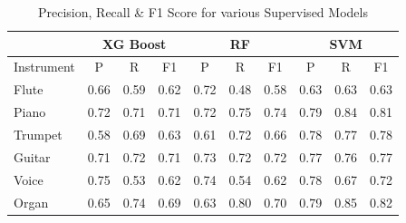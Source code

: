 \documentclass{article}
\begin{document}
\begin{itemize}
\begin{center}
\begin{table}[h!]
			
			\begin{tabular}{@{}l|lll|lll|lll@{}}
				\toprule
				& \multicolumn{3}{c}{\textbf{XG Boost}}                                  & \multicolumn{3}{c}{\textbf{RF}}                                        & \multicolumn{3}{c}{\textbf{SVM}}                                       \\ \midrule
				Instrument & \multicolumn{1}{c}{P} & \multicolumn{1}{c}{R} & \multicolumn{1}{c}{F1} & \multicolumn{1}{c}{P} & \multicolumn{1}{c}{R} & \multicolumn{1}{c}{F1} & \multicolumn{1}{c}{P} & \multicolumn{1}{c}{R} & \multicolumn{1}{c}{F1} \\
				Flute      & 0.66                  & 0.59                  & 0.62                   & 0.72                  & 0.48                  & 0.58                   & 0.63                  & 0.63                  & 0.63                   \\
				Piano      & 0.72                  & 0.71                  & 0.71                   & 0.72                  & 0.75                  & 0.74                   & 0.79                  & 0.84                  & 0.81                   \\
				Trumpet    & 0.58                  & 0.69                  & 0.63                   & 0.61                  & 0.72                  & 0.66                   & 0.78                  & 0.77                  & 0.78                   \\
				Guitar     & 0.71                  & 0.72                  & 0.71                   & 0.73                  & 0.72                  & 0.72                   & 0.77                  & 0.76                  & 0.77                   \\
				Voice      & 0.75                  & 0.53                  & 0.62                   & 0.74                  & 0.54                  & 0.62                   & 0.78                  & 0.67                  & 0.72                   \\
				Organ      & 0.65                  & 0.74                  & 0.69                   & 0.63                  & 0.80                  & 0.70                   & 0.79                  & 0.85                  & 0.82                   \\ \bottomrule
			\end{tabular}
			\vspace{0.1 in }
			\caption{Precision, Recall \& F1 Score for  various Supervised Models}
		\end{table}
		
	\end{center}
	
\end{itemize}
\end{document}
